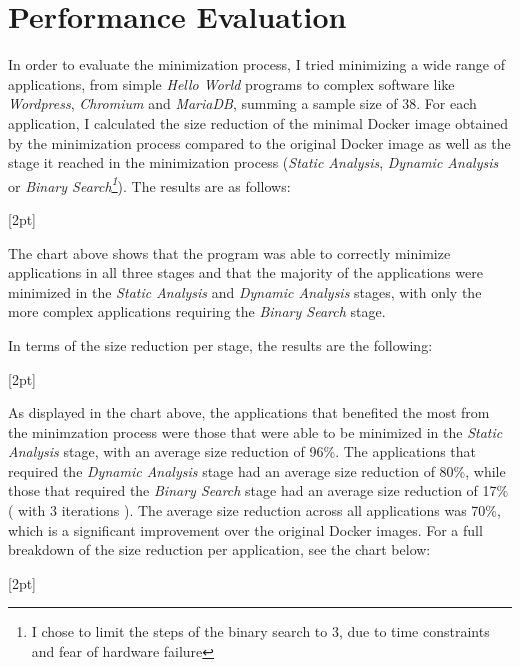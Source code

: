 \chapter{Performance Evaluation}
\label{chapter:performance-evaluation}

In order to evaluate the minimization process, I tried minimizing a wide range of applications, from simple \textit{Hello World} programs to complex 
software like \textit{Wordpress}, \textit{Chromium} and \textit{MariaDB}, summing a sample size of 
38. For each application, I calculated the size reduction of the minimal Docker image obtained by the minimization process compared to the 
original Docker image as well as the stage it reached in the minimization process (\textit{Static Analysis}, \textit{Dynamic Analysis} or \textit{Binary Search\footnote{I chose to limit the steps of the binary search to 3, due to time constraints and fear of hardware failure }}).
The results are as follows:

[2pt]

The chart above shows that the program was able to correctly minimize applications in all three stages and that the majority of the applications were minimized in the 
\textit{Static Analysis} and \textit{Dynamic Analysis} stages, with only the more complex applications requiring the \textit{Binary Search} stage.

In terms of the size reduction per stage, the results are the following:

[2pt]

As displayed in the chart above, the applications that benefited the most from the minimzation process were those that were able to be minimized in the \textit{Static Analysis} stage, with an average size reduction of 96\%. The applications that required the \textit{Dynamic Analysis} stage had an average size reduction of 80\%, while those that required the \textit{Binary Search} stage had an average size reduction of 17\% ( with 3 iterations ).
The average size reduction across all applications was 70\%, which is a significant improvement over the original Docker images.
For a full breakdown of the size reduction per application, see the chart below: 

[2pt]

